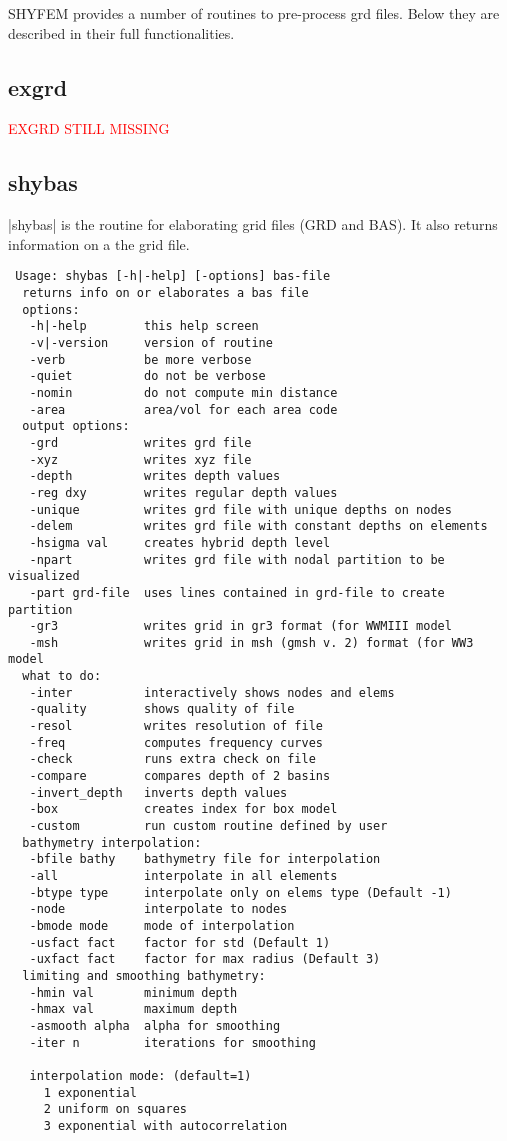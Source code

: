 SHYFEM provides a number of routines to pre-process grd files. Below they are described in their full functionalities.
\subsection{exgrd}
\textcolor{red}{EXGRD STILL MISSING}
\subsection{shybas}
|shybas| is the routine for elaborating grid files (GRD and BAS). It also returns
information on a the grid file.

\begin{verbatim}
 Usage: shybas [-h|-help] [-options] bas-file
  returns info on or elaborates a bas file
  options:
   -h|-help        this help screen
   -v|-version     version of routine
   -verb           be more verbose
   -quiet          do not be verbose
   -nomin          do not compute min distance
   -area           area/vol for each area code
  output options:
   -grd            writes grd file
   -xyz            writes xyz file
   -depth          writes depth values
   -reg dxy        writes regular depth values
   -unique         writes grd file with unique depths on nodes
   -delem          writes grd file with constant depths on elements
   -hsigma val     creates hybrid depth level
   -npart          writes grd file with nodal partition to be visualized
   -part grd-file  uses lines contained in grd-file to create partition
   -gr3            writes grid in gr3 format (for WWMIII model
   -msh            writes grid in msh (gmsh v. 2) format (for WW3 model
  what to do:
   -inter          interactively shows nodes and elems
   -quality        shows quality of file
   -resol          writes resolution of file
   -freq           computes frequency curves
   -check          runs extra check on file
   -compare        compares depth of 2 basins
   -invert_depth   inverts depth values
   -box            creates index for box model
   -custom         run custom routine defined by user
  bathymetry interpolation:
   -bfile bathy    bathymetry file for interpolation
   -all            interpolate in all elements
   -btype type     interpolate only on elems type (Default -1)
   -node           interpolate to nodes
   -bmode mode     mode of interpolation
   -usfact fact    factor for std (Default 1)
   -uxfact fact    factor for max radius (Default 3)
  limiting and smoothing bathymetry:
   -hmin val       minimum depth
   -hmax val       maximum depth
   -asmooth alpha  alpha for smoothing
   -iter n         iterations for smoothing
  
   interpolation mode: (default=1)
     1 exponential
     2 uniform on squares
     3 exponential with autocorrelation
\end{verbatim}

